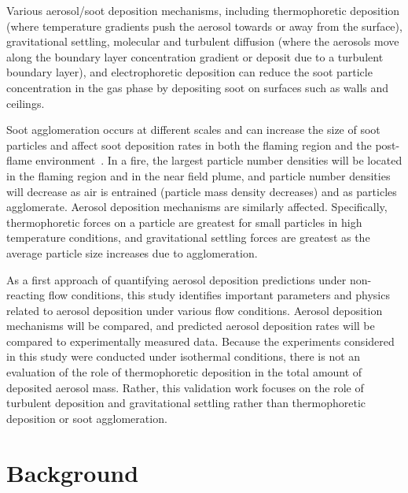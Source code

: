 Various aerosol/soot deposition mechanisms, including thermophoretic deposition (where temperature gradients push the aerosol towards or away from the surface), gravitational settling, molecular and turbulent diffusion (where the aerosols move along the boundary layer concentration gradient or deposit due to a turbulent boundary layer), and electrophoretic deposition can reduce the soot particle concentration in the gas phase by depositing soot on surfaces such as walls and ceilings.

Soot agglomeration occurs at different scales and can increase the size of soot particles and affect soot deposition rates in both the flaming region and the post-flame environment~\cite{Butler:2004p433,mulholland1977coagulation}. In a fire, the largest particle number densities will be located in the flaming region and in the near field plume, and particle number densities will decrease as air is entrained (particle mass density decreases) and as particles agglomerate. Aerosol deposition mechanisms are similarly affected. Specifically, thermophoretic forces on a particle are greatest for small particles in high temperature conditions, and gravitational settling forces are greatest as the average particle size increases due to agglomeration.

As a first approach of quantifying aerosol deposition predictions under non-reacting flow conditions, this study identifies important parameters and physics related to aerosol deposition under various flow conditions. Aerosol deposition mechanisms will be compared, and predicted aerosol deposition rates will be compared to experimentally measured data. Because the experiments considered in this study were conducted under isothermal conditions, there is not an evaluation of the role of thermophoretic deposition in the total amount of deposited aerosol mass. Rather, this validation work focuses on the role of turbulent deposition and gravitational settling rather than thermophoretic deposition or soot agglomeration.

\section{Background}
\label{sec:Background}

